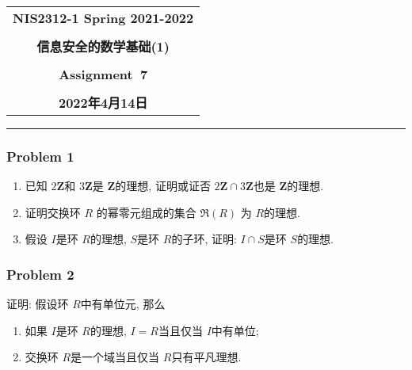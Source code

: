\documentclass[a4paper,12pt]{ctexart}
\newcommand{\Z}{\mathbf{Z}}
\begin{document}
  \begin{center}

  \vspace{-0.3in}
  \begin{tabular}{c}
    \textbf{\Large NIS2312-1 Spring 2021-2022} \\
    \textbf{\Large  } \\
    \textbf{\Large  信息安全的数学基础(1)} \\
    \textbf{\Large  } \\
    \textbf{\Large  Assignment~7} \\
    \textbf{\Large  } \\
    \textbf{\Large 2022年4月14日} \\
  \end{tabular}
  \end{center}
  \noindent
  \rule{\linewidth}{0.4pt}

\subsubsection*{Problem 1}
    \begin{enumerate}
      \item 已知 $ 2\Z $和 $ 3\Z $是 $ \Z $的理想, 证明或证否 $ 2\Z\cap 3\Z $也是 $ \Z $的理想.
      \item 证明交换环 $ R $ 的幂零元组成的集合 $ \mathfrak{R} (R) $ 为 $ R $的理想.
      \item 假设 $ I $是环 $ R $的理想, $ S $是环 $ R $的子环, 证明: $ I\cap S $是环 $ S $的理想.
    \end{enumerate}
\subsubsection*{Problem 2}
   证明: 假设环 $ R $中有单位元, 那么
   \begin{enumerate}
      \item 如果 $ I $是环 $ R $的理想, $ I=R $当且仅当 $ I $中有单位;
      \item 交换环 $ R $是一个域当且仅当 $ R $只有平凡理想.
    \end{enumerate}
\end{document}
